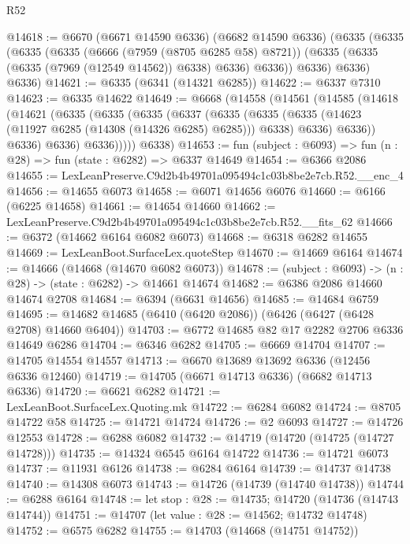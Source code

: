 \begin{lexlean}{R52}
\begin{coremodule}
@14618 := @6670
    (@6671 @14590 @6336)
    (@6682 @14590 @6336)
    (@6335
      (@6335
        (@6335
          (@6335
            (@6666 (@7959 (@8705 @6285 @58) @8721))
            (@6335 (@6335 (@6335 (@7969 (@12549 @14562)) @6338) @6336) @6336))
          @6336)
        @6336)
      @6336)
@14621 := @6335 (@6341 (@14321 @6285))
@14622 := @6337 @7310
@14623 := @6335 @14622
@14649 := @6668
    (@14558
      (@14561
        (@14585
          (@14618
            (@14621
              (@6335
                (@6335
                  (@6335
                    (@6337
                      (@6335
                        (@6335
                          (@6335 (@14623 (@11927 @6285 (@14308 (@14326 @6285) @6285))) @6338)
                          @6336)
                        @6336))
                    @6336)
                  @6336)
                @6336)))))
      @6338)
@14653 := fun (subject : @6093) => fun (n : @28) => fun (state : @6282) => @6337 @14649
@14654 := @6366 @2086
@14655 := LexLeanPreserve.C9d2b4b49701a095494c1c03b8be2e7cb.R52.__enc_4
@14656 := @14655 @6073
@14658 := @6071 @14656 @6076
@14660 := @6166 (@6225 @14658)
@14661 := @14654 @14660
@14662 := LexLeanPreserve.C9d2b4b49701a095494c1c03b8be2e7cb.R52.__fits_62
@14666 := @6372 (@14662 @6164 @6082 @6073)
@14668 := @6318 @6282 @14655
@14669 := LexLeanBoot.SurfaceLex.quoteStep
@14670 := @14669 @6164
@14674 := @14666 (@14668 (@14670 @6082 @6073))
@14678 := (subject : @6093) -> (n : @28) -> (state : @6282) -> @14661 @14674
@14682 := @6386 @2086 @14660 @14674 @2708
@14684 := @6394 (@6631 @14656)
@14685 := @14684 @6759
@14695 := @14682 @14685 (@6410 (@6420 @2086)) (@6426 (@6427 (@6428 @2708) @14660 @6404))
@14703 := @6772 @14685 @82 @17 @2282 @2706 @6336 @14649 @6286
@14704 := @6346 @6282
@14705 := @6669 @14704
@14707 := @14705 @14554 @14557
@14713 := @6670 @13689 @13692 @6336 (@12456 @6336 @12460)
@14719 := @14705 (@6671 @14713 @6336) (@6682 @14713 @6336)
@14720 := @6621 @6282
@14721 := LexLeanBoot.SurfaceLex.Quoting.mk
@14722 := @6284 @6082
@14724 := @8705 @14722 @58
@14725 := @14721 @14724
@14726 := @2 @6093
@14727 := @14726 @12553
@14728 := @6288 @6082
@14732 := @14719 (@14720 (@14725 (@14727 @14728)))
@14735 := @14324 @6545 @6164 @14722
@14736 := @14721 @6073
@14737 := @11931 @6126
@14738 := @6284 @6164
@14739 := @14737 @14738
@14740 := @14308 @6073
@14743 := @14726 (@14739 (@14740 @14738))
@14744 := @6288 @6164
@14748 := let stop : @28 := @14735; @14720 (@14736 (@14743 @14744))
@14751 := @14707 (let value : @28 := @14562; @14732 @14748)
@14752 := @6575 @6282
@14755 := @14703 (@14668 (@14751 @14752))

\end{coremodule}
\end{lexlean}
